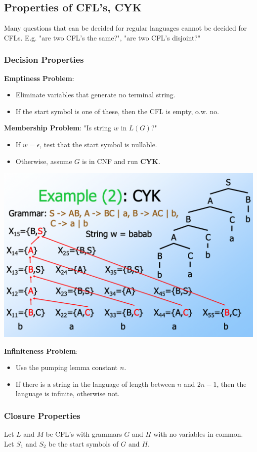 \subsection{\color{ForestGreen}Properties of CFL's, CYK}
 Many questions that can be decided for regular languages cannot be decided for CFLs. E.g. "are two CFL's the same?", "are two CFL's disjoint?"
\subsubsection{Decision Properties}
\textbf{Emptiness Problem}: 
\begin{itemize}
    \item Eliminate variables that generate no terminal string. 
    \item If the start symbol is one of these, then the CFL is empty, o.w. no.
\end{itemize}
\textbf{Membership Problem}: "Is string $w$ in $L(G)$?"
\begin{itemize}
    \item If $w = \epsilon$, test that the start symbol is nullable.
    \item Otherwise, assume $G$ is in CNF and run \textbf{CYK}.
\end{itemize}

\begin{Figure}
 \includegraphics[width=0.7\linewidth]{figures/CYK.png}
\end{Figure}
\textbf{Infiniteness Problem}:
\begin{itemize}
    \item Use the pumping lemma constant $n$. 
    \item If there is a string in the language of length between $n$ and $2n -1$, then the language is infinite, otherwise not.
\end{itemize}
\subsubsection{Closure Properties}
Let $L$ and $M$ be CFL's with grammars $G$ and $H$ with no variables in common.
Let $S_1$ and $S_2$ be the start symbols of $G$ and $H$. 

